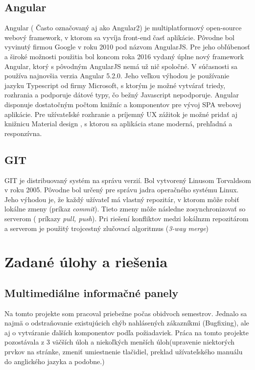 \documentclass[11pt, oneside]{report}
\begin{document}
\section{Angular}
Angular\cite{angular} ( Často označovaný aj ako Angular2) je multiplatformový  open-source webový framework, v ktorom sa vyvíja front-end časť aplikácie. Pôvodne bol vyvinutý firmou Google v roku 2010 pod názvom AngularJS. Pre jeho obľúbenosť a široké  možnosti použitia bol koncom roka 2016 vydaný úplne nový framework Angular, ktorý s pôvodným AngularJS nemá už nič spoločné. V súčasnosti sa používa najnovšia verzia Angular 5.2.0.
Jeho veľkou výhodou je používanie jazyku Typescript od firmy Microsoft,  s ktorým je možné vytvárať triedy, rozhrania a podporuje dátové typy, čo bežný Javascript nepodporuje. Angular disponuje dostatočným počtom knižníc a komponentov pre vývoj  SPA webovej aplikácie. Pre užívateľské rozhranie a príjemný UX zážitok je možné pridať aj knižnicu Material design \cite{material}, s ktorou  sa aplikácia stane moderná, prehľadná a responzívna.

\section{GIT}
GIT\cite{git} je distribuovaný systém na správu verzií. Bol vytvorený Linusom Torvaldsom v roku 2005. Pôvodne bol určený pre správu jadra operačného systému Linux. Jeho výhodou je, že každý užívateľ má vlastný repozitár, v ktorom môže robiť lokálne zmeny (príkaz \textit{commit}). Tieto zmeny môže následne zosynchronizovať  so serverom ( príkazy \textit{ pull, push}). Pri riešení konfliktov medzi lokálnzm repozitárom a serverom je použitý trojcestný zlučovací algoritmus (\textit{3-way merge}) 

\chapter{Zadané úlohy a riešenia}
\section{Multimediálne informačné panely}
Na tomto projekte som pracoval  priebežne počas  obidvoch semestrov. Jednalo sa najmä o  odstraňovanie existujúcich chýb nahlásených zákazníkmi (Bugfixing), ale aj o vytváranie ďalších komponentov podľa požiadaviek. Práca na tomto projekte pozostávala z 3 väčších úloh  a  niekoľkých menších úloh(upravenie niektorých prvkov na stránke, zmeniť umiestnenie tlačidiel, preklad užívateľského manuálu do anglického jazyka a podobne.)
\end{document}
